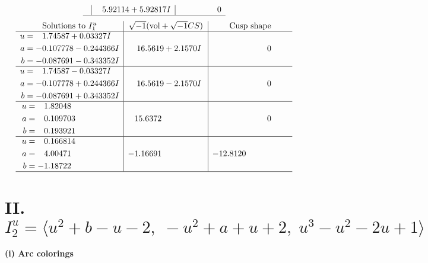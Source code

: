 \documentclass[1p]{elsarticle_modified}
\theoremstyle{definition}
\newcommand{\I}{\sqrt{-1}}
\begin{document}
$$\begin{array}{c|c|c}
 & \phantom{-}5.92114 + 5.92817 I & \phantom{-0.000000 } 0\\
 \hline 
 \end{array}$$\newpage$$\begin{array}{c|c|c}  
\text{Solutions to }I^u_{1}& \I (\text{vol} + \sqrt{-1}CS) & \text{Cusp shape}\\
 \hline 
\begin{aligned}
u &= \phantom{-}1.74587 + 0.03327 I \\
a &= -0.107778 - 0.244366 I \\
b &= -0.087691 - 0.343352 I\end{aligned}
 & \phantom{-}16.5619 + 2.1570 I & \phantom{-0.000000 } 0 \\ \hline\begin{aligned}
u &= \phantom{-}1.74587 - 0.03327 I \\
a &= -0.107778 + 0.244366 I \\
b &= -0.087691 + 0.343352 I\end{aligned}
 & \phantom{-}16.5619 - 2.1570 I & \phantom{-0.000000 } 0 \\ \hline\begin{aligned}
u &= \phantom{-}1.82048\phantom{ +0.000000I} \\
a &= \phantom{-}0.109703\phantom{ +0.000000I} \\
b &= \phantom{-}0.193921\phantom{ +0.000000I}\end{aligned}
 & \phantom{-}15.6372\phantom{ +0.000000I} & \phantom{-0.000000 } 0 \\ \hline\begin{aligned}
u &= \phantom{-}0.166814\phantom{ +0.000000I} \\
a &= \phantom{-}4.00471\phantom{ +0.000000I} \\
b &= -1.18722\phantom{ +0.000000I}\end{aligned}
 & -1.16691\phantom{ +0.000000I} & -12.8120\phantom{ +0.000000I}\\
 \hline 
 \end{array}$$\newpage\newpage\renewcommand{\arraystretch}{1}
\centering \section*{II. $I^u_{2}= \langle u^2+b- u-2,\;- u^2+a+u+2,\;u^3- u^2-2 u+1 \rangle$}
\flushleft \textbf{(i) Arc colorings}\\
\end{document}
